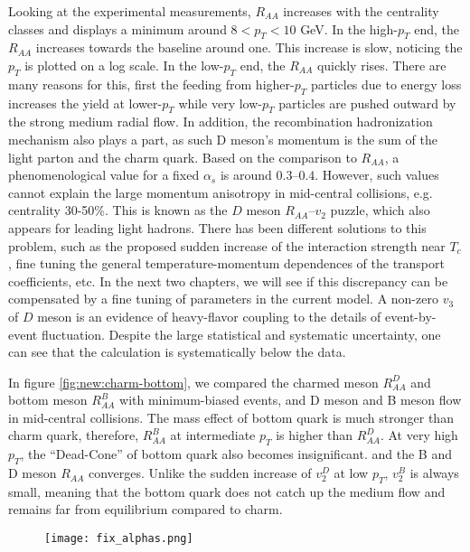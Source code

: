 Looking at the experimental measurements, $R_{AA}$ increases with the centrality classes and displays a minimum around $8 < p_T < 10$ GeV.
In the high-$p_T$ end, the $R_{AA}$ increases towards the baseline around one. 
This increase is slow, noticing the $p_T$ is plotted on a log scale.
In the low-$p_T$ end, the $R_{AA}$ quickly rises.
There are many reasons for this, first the feeding from higher-$p_T$ particles due to energy loss increases the yield at lower-$p_T$ while very low-$p_T$ particles are pushed outward by the strong medium radial flow.
In addition, the recombination hadronization mechanism also plays a part, as such D meson's momentum is the sum of the light parton and the charm quark.
Based on the comparison to $R_{AA}$, a phenomenological value for a fixed $\alpha_s$ is around $0.3$--$0.4$.
However, such values cannot explain the large momentum anisotropy in mid-central collisions, e.g. centrality 30-50\%.
This is known as the $D$ meson $R_{AA}$--$v_2$ puzzle, which also appears for leading light hadrons.
There has been different solutions to this problem, such as the proposed sudden increase of the interaction strength near $T_c$, fine tuning the general temperature-momentum dependences of the transport coefficients, etc.
In the next two chapters, we will see if this discrepancy can be compensated by a fine tuning of parameters in the current model.
A non-zero $v_3$ of $D$ meson is an evidence of heavy-flavor coupling to the details of event-by-event fluctuation.
Despite the large statistical and systematic uncertainty, one can see that the calculation is systematically below the data.

In figure \ref{fig:new:charm-bottom}, we compared the charmed meson $R_{AA}^D$ and bottom meson $R_{AA}^B$ with minimum-biased events, and D meson and B meson flow in mid-central collisions.
The mass effect of bottom quark is much stronger than charm quark, therefore, $R_{AA}^B$ at intermediate $p_T$ is higher than $R_{AA}^D$. 
At very high $p_T$, the ``Dead-Cone'' of bottom quark also becomes insignificant. and the B and D meson $R_{AA}$ converges.
Unlike the sudden increase of $v_2^D$ at low $p_T$, $v_2^B$ is always small, meaning that the bottom quark does not catch up the medium flow and remains far from equilibrium compared to charm.

\begin{figure}
\centering
\texttt{[image: fix\_alphas.png]}
\caption{}
\label{fig:new:fix-a}
\end{figure}

